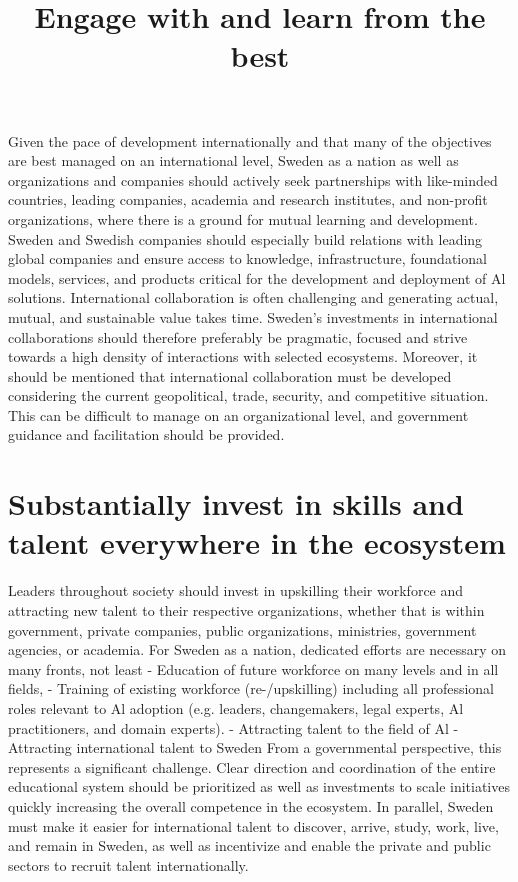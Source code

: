 \title{
Engage with and learn from the best
}
Given the pace of development internationally and that many of the objectives are best managed on an international level, Sweden as a nation as well as organizations and companies should actively seek partnerships with like-minded countries, leading companies, academia and research institutes, and non-profit organizations, where there is a ground for mutual learning and development.
Sweden and Swedish companies should especially build relations with leading global companies and ensure access to knowledge, infrastructure, foundational models, services, and products critical for the development and deployment of Al solutions.
International collaboration is often challenging and generating actual, mutual, and sustainable value takes time. Sweden's investments in international collaborations should therefore preferably be pragmatic, focused and strive towards a high density of interactions with selected ecosystems.
Moreover, it should be mentioned that international collaboration must be developed considering the current geopolitical, trade, security, and competitive situation. This can be difficult to manage on an organizational level, and government guidance and facilitation should be provided.
\section*{Substantially invest in skills and talent everywhere in the ecosystem}
Leaders throughout society should invest in upskilling their workforce and attracting new talent to their respective organizations, whether that is within government, private companies, public organizations, ministries, government agencies, or academia.
For Sweden as a nation, dedicated efforts are necessary on many fronts, not least
- Education of future workforce on many levels and in all fields,
- Training of existing workforce (re-/upskilling) including all professional roles relevant to Al adoption (e.g. leaders, changemakers, legal experts, Al practitioners, and domain experts).
- Attracting talent to the field of Al
- Attracting international talent to Sweden
From a governmental perspective, this represents a significant challenge. Clear direction and coordination of the entire educational system should be prioritized as well as investments to scale initiatives quickly increasing the overall competence in the ecosystem.
In parallel, Sweden must make it easier for international talent to discover, arrive, study, work, live, and remain in Sweden, as well as incentivize and enable the private and public sectors to recruit talent internationally.

